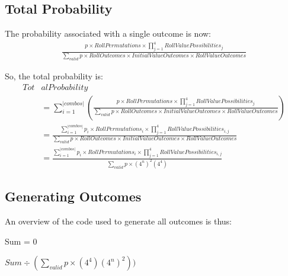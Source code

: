 \documentclass[12pt]{article}
\begin{document}
\subsection{Total Probability}

The probability associated with a single outcome is now:
\begin{align*}
	\frac{p \times RollPermutations \times \prod_{j = 1}^{4} RollValuePossibilities_j}{\sum_{valid} p \times RollOutcomes \times InitialValueOutcomes \times RollValueOutcomes}
\end{align*}

So, the total probability is:
\begin{align*}
	Tot&alProbability \\[8pt]
	&= \sum_{i = 1}^{|combos|}\left(\frac{p \times RollPermutations \times \prod_{j = 1}^{4} RollValuePossibilities_j}{\sum_{valid} p \times RollOutcomes \times InitialValueOutcomes \times RollValueOutcomes}\right) \\[12pt]
	&= \frac{\sum_{i = 1}^{|combos|} p_i \times RollPermutations_i \times \prod_{j = 1}^{4} RollValuePossibilities_{i,j}}{\sum_{valid} p \times RollOutcomes \times InitialValueOutcomes \times RollValueOutcomes} \\[12pt]
	&= \frac{\sum_{i = 1}^{|combos|} p_i \times RollPermutations_i \times \prod_{j = 1}^{4} RollValuePossibilities_{i,j}}{\sum_{valid} p \times (4^n)^2(4^4)}
\end{align*}

\subsection{Generating Outcomes}

An overview of the code used to generate all outcomes is thus:

\begin{algorithm}[H]
	\SetInd{0.4em}{0.4em}

	Sum = 0 \\
	
	
	\Return $Sum \div (\sum_{valid} p \times (4^4)(4^n)^2))$
\end{algorithm}
\end{document}
